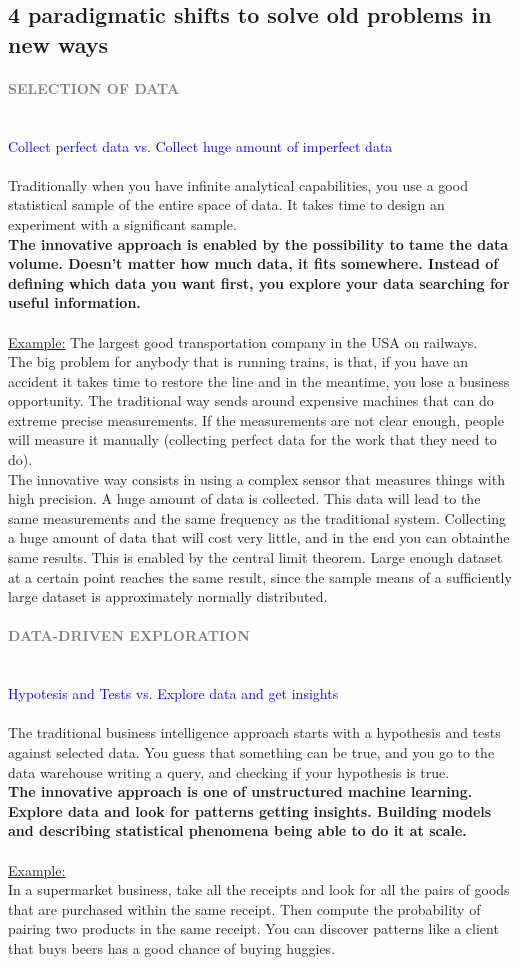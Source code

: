 \documentclass[10pt,a4paper]{article}
\newcommand{\nline}{\\~\\}
\newcommand{\myparagraph}[1]{\paragraph{\normalsize{\textcolor{gray}{\uppercase{\textbf{#1}}}} }\mbox{} \vspace{0.5em}\\}
\begin{document}
\subsection{4 paradigmatic shifts to solve old problems in new ways}
\myparagraph{Selection of Data}
\textcolor{blue}{Collect perfect data vs. Collect huge amount of imperfect data}
\nline
Traditionally when you have infinite analytical capabilities, you use a good statistical sample of the entire space of data. It takes time to design an experiment with a significant sample. \\
\textbf{The innovative approach is enabled by the possibility to tame the data volume. Doesn’t matter how much data, it fits somewhere. Instead of defining which data you want first, you explore your data searching for useful information.}
\nline
\uline{Example:}
The largest good transportation company in the USA on railways. \\ The big problem for anybody that is running trains, is that, if you have an accident it takes time to restore the line and in the meantime, you lose a business opportunity. 
The traditional way sends around expensive machines that can do extreme precise measurements. If the measurements are not clear enough, people will measure it manually (collecting perfect data for the work that they need to do). \\
The innovative way consists in using a complex sensor that measures things with high precision. A huge amount of data is collected. This data will lead to the same measurements and the same frequency as the traditional system. Collecting a huge amount of data that will cost very little, and in the end you can obtainthe same results. This is enabled by the central limit theorem. Large enough dataset at a certain point reaches the same result, since the sample means of a sufficiently large dataset is approximately normally distributed. 
\pagebreak
\myparagraph{Data-driven exploration}
\textcolor{blue}{Hypotesis and Tests vs. Explore data and get insights}
\nline
The traditional business intelligence approach starts with a hypothesis and tests against selected data. You guess that something can be true, and you go to the data warehouse writing a query, and checking if your hypothesis is true. \\
\textbf{The innovative approach is one of unstructured machine learning. Explore data and look for patterns getting insights. Building models and describing statistical phenomena being able to do it at scale. }\nline
\uline{Example:} \\
In a supermarket business, take all the receipts and look for all the pairs of goods that are purchased within the same receipt. Then compute the probability of pairing two products in the same receipt. You can discover patterns like a client that buys beers has a good chance of buying huggies.
\end{document}
